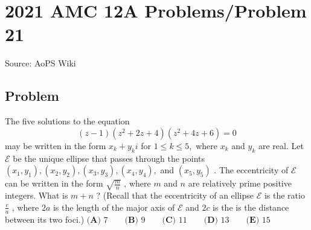 \documentclass[12pt]{article}
\begin{document}
\section*{{2021 AMC 12A Problems/Problem 21}}
Source: AoPS Wiki

\subsection*{Problem}
The five solutions to the equation \[(z-1)(z^2+2z+4)(z^2+4z+6)=0\] may be written in the form $x_k+y_ki$ for $1\le k\le 5,$ where $x_k$ and $y_k$ are real. Let $\mathcal E$ be the unique ellipse that passes through the points $(x_1,y_1),(x_2,y_2),(x_3,y_3),(x_4,y_4),$ and $(x_5,y_5)$ . The eccentricity of $\mathcal E$ can be written in the form $\sqrt{\frac mn}$ , where $m$ and $n$ are relatively prime positive integers. What is $m+n$ ? (Recall that the eccentricity of an ellipse $\mathcal E$ is the ratio $\frac ca$ , where $2a$ is the length of the major axis of $\mathcal E$ and $2c$ is the is the distance between its two foci.) $\textbf{(A) }7 \qquad \textbf{(B) }9 \qquad \textbf{(C) }11 \qquad \textbf{(D) }13\qquad \textbf{(E) }15$
\end{document}

